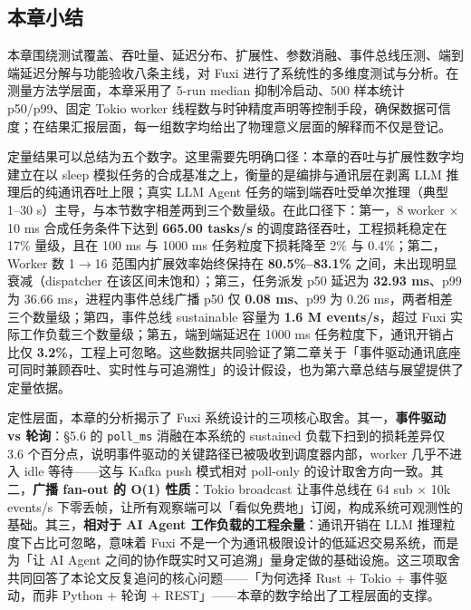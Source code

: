 \subsection{本章小结}

本章围绕测试覆盖、吞吐量、延迟分布、扩展性、参数消融、事件总线压测、端到端延迟分解与功能验收八条主线，对 Fuxi 进行了系统性的多维度测试与分析。在测量方法学层面，本章采用了 5-run median 抑制冷启动、500 样本统计 p50/p99、固定 Tokio worker 线程数与时钟精度声明等控制手段，确保数据可信度；在结果汇报层面，每一组数字均给出了物理意义层面的解释而不仅是登记。

定量结果可以总结为五个数字。这里需要先明确口径：本章的吞吐与扩展性数字均建立在以 sleep 模拟任务的合成基准之上，衡量的是编排与通讯层在剥离 LLM 推理后的纯通讯吞吐上限；真实 LLM Agent 任务的端到端吞吐受单次推理（典型 1--30 s）主导，与本节数字相差两到三个数量级。在此口径下：第一，8 worker × 10 ms 合成任务条件下达到 \textbf{665.00 tasks/s} 的调度路径吞吐，工程损耗稳定在 17\% 量级，且在 100 ms 与 1000 ms 任务粒度下损耗降至 2\% 与 0.4\%；第二，Worker 数 1$\to$16 范围内扩展效率始终保持在 \textbf{80.5\%--83.1\%} 之间，未出现明显衰减（dispatcher 在该区间未饱和）；第三，任务派发 p50 延迟为 \textbf{32.93 ms}、p99 为 36.66 ms，进程内事件总线广播 p50 仅 \textbf{0.08 ms}、p99 为 0.26 ms，两者相差三个数量级；第四，事件总线 sustainable 容量为 \textbf{1.6 M events/s}，超过 Fuxi 实际工作负载三个数量级；第五，端到端延迟在 1000 ms 任务粒度下，通讯开销占比仅 \textbf{3.2\%}，工程上可忽略。这些数据共同验证了第二章关于「事件驱动通讯底座可同时兼顾吞吐、实时性与可追溯性」的设计假设，也为第六章总结与展望提供了定量依据。

定性层面，本章的分析揭示了 Fuxi 系统设计的三项核心取舍。其一，\textbf{事件驱动 vs 轮询}：§5.6 的 \texttt{poll\_ms} 消融在本系统的 sustained 负载下扫到的损耗差异仅 3.6 个百分点，说明事件驱动的关键路径已被吸收到调度器内部，worker 几乎不进入 idle 等待——这与 Kafka push 模式相对 poll-only 的设计取舍方向一致。其二，\textbf{广播 fan-out 的 O(1) 性质}：Tokio broadcast 让事件总线在 64 sub × 10k events/s 下零丢帧，让所有观察端可以「看似免费地」订阅，构成系统可观测性的基础。其三，\textbf{相对于 AI Agent 工作负载的工程余量}：通讯开销在 LLM 推理粒度下占比可忽略，意味着 Fuxi 不是一个为通讯极限设计的低延迟交易系统，而是为「让 AI Agent 之间的协作既实时又可追溯」量身定做的基础设施。这三项取舍共同回答了本论文反复追问的核心问题——「为何选择 Rust + Tokio + 事件驱动，而非 Python + 轮询 + REST」——本章的数字给出了工程层面的支撑。
